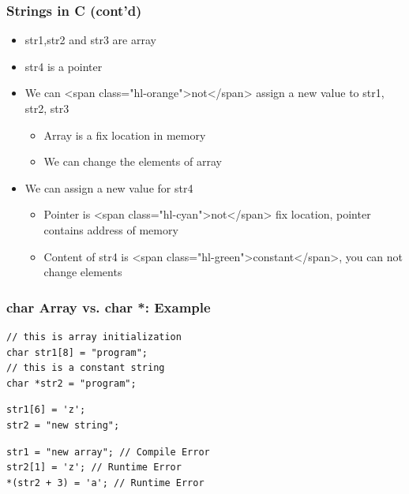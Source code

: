 \documentclass{../c-lecture}
\begin{document}
\begin{frame}
  \frametitle{Strings in C (cont’d)}
  \begin{itemize}
    \item str1,str2 and str3 are array
    \item str4 is a pointer
    \item
      We can <span class="hl-orange">not</span> assign a new value to str1,
      str2, str3

    \begin{itemize}
      \item Array is a fix location in memory
      \item We can change the elements of array
    \end{itemize}
    \item We can assign a new value for str4
    \begin{itemize}
      \item
        Pointer is <span class="hl-cyan">not</span> fix location, pointer
        contains address of memory

      \item
        Content of str4 is <span class="hl-green">constant</span>, you can not
        change elements

    \end{itemize}
  \end{itemize}
\end{frame}

\begin{frame}[fragile]
  \frametitle{char Array vs. char *: Example}
  \begin{verbatim}
// this is array initialization
char str1[8] = "program";
// this is a constant string
char *str2 = "program";
  \end{verbatim}
  \begin{verbatim}
str1[6] = 'z';
str2 = "new string";
  \end{verbatim}
  \begin{verbatim}
str1 = "new array"; // Compile Error
str2[1] = 'z'; // Runtime Error
*(str2 + 3) = 'a'; // Runtime Error
  \end{verbatim}
\end{frame}
\end{document}
